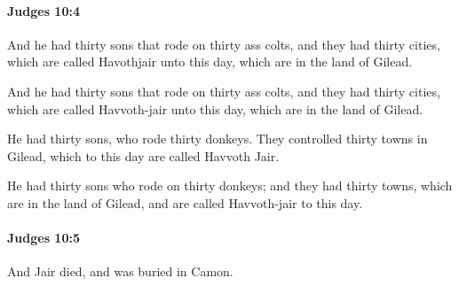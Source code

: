		\paragraph{Judges 10:4} %
			\label{JUDGES-10-4}

			And he had thirty sons that rode on thirty ass colts, and they had thirty cities, which are called Havothjair unto this day, which are in the land of Gilead.

			\begin{versebox}
					\item[BHS] 
					\item[ASV] And he had thirty sons that rode on thirty ass colts, and they had thirty cities, which are called Havvoth-jair unto this day, which are in the land of Gilead.
					\item[NIV] He had thirty sons, who rode thirty donkeys. They controlled thirty towns in Gilead, which to this day are called Havvoth Jair.
					\item[NRSV] He had thirty sons who rode on thirty donkeys; and they had thirty towns, which are in the land of Gilead, and are called Havvoth-jair to this day.
			\end{versebox}

		\paragraph{Judges 10:5} %
			\label{JUDGES-10-5}

			And Jair died, and was buried in Camon.

